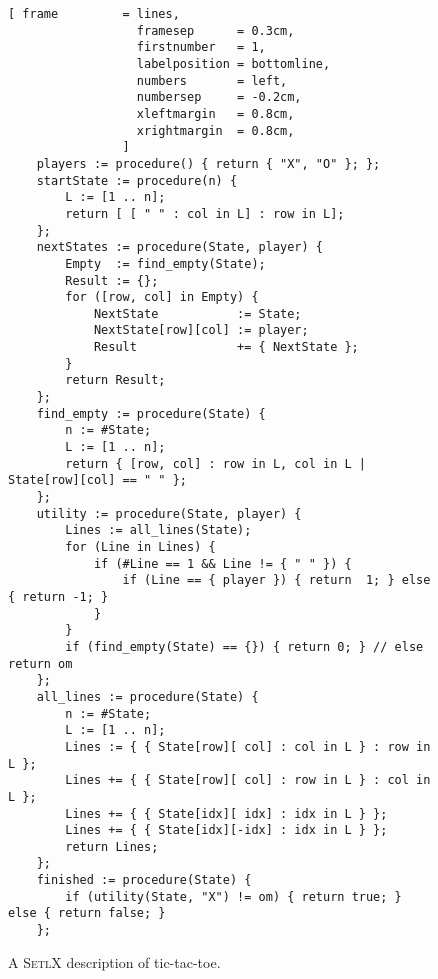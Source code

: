 \begin{figure}[!ht]
\centering
\begin{Verbatim}[ frame         = lines, 
                  framesep      = 0.3cm, 
                  firstnumber   = 1,
                  labelposition = bottomline,
                  numbers       = left,
                  numbersep     = -0.2cm,
                  xleftmargin   = 0.8cm,
                  xrightmargin  = 0.8cm,
                ]
    players := procedure() { return { "X", "O" }; };
    startState := procedure(n) {
        L := [1 .. n];
        return [ [ " " : col in L] : row in L];
    };
    nextStates := procedure(State, player) {
        Empty  := find_empty(State);
        Result := {};
        for ([row, col] in Empty) {
            NextState           := State;
            NextState[row][col] := player;
            Result              += { NextState };
        }
        return Result;
    };
    find_empty := procedure(State) {
        n := #State;
        L := [1 .. n];
        return { [row, col] : row in L, col in L | State[row][col] == " " };
    };
    utility := procedure(State, player) {
        Lines := all_lines(State);
        for (Line in Lines) {
            if (#Line == 1 && Line != { " " }) {
                if (Line == { player }) { return  1; } else { return -1; }
            }
        }
        if (find_empty(State) == {}) { return 0; } // else return om
    };
    all_lines := procedure(State) {
        n := #State;
        L := [1 .. n];
        Lines := { { State[row][ col] : col in L } : row in L };
        Lines += { { State[row][ col] : row in L } : col in L };
        Lines += { { State[idx][ idx] : idx in L } };
        Lines += { { State[idx][-idx] : idx in L } };
        return Lines;
    };
    finished := procedure(State) {
        if (utility(State, "X") != om) { return true; } else { return false; }
    };
\end{Verbatim}
\vspace*{-0.3cm}
\caption{A \textsc{SetlX} description of tic-tac-toe.}
\label{fig:ttt.stlx}
\end{figure}
 


